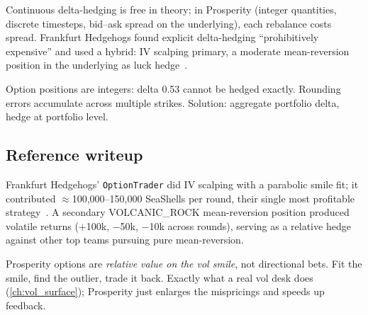 \begin{pitfallbox}
Continuous delta-hedging is free in theory; in Prosperity (integer
quantities, discrete timesteps, bid--ask spread on the underlying),
each rebalance costs spread.  Frankfurt Hedgehogs found explicit
delta-hedging ``prohibitively expensive'' and used a hybrid: IV
scalping primary, a moderate mean-reversion position in the
underlying as luck
hedge~\citep{frankfurthedgehogs2025}.
\end{pitfallbox}

\begin{pitfallbox}
Option positions are integers: delta 0.53 cannot be hedged exactly.
Rounding errors accumulate across multiple strikes.  Solution:
aggregate portfolio delta, hedge at portfolio level.
\end{pitfallbox}

\subsection{Reference writeup}

Frankfurt Hedgehogs' \texttt{OptionTrader} did IV scalping with a
parabolic smile fit; it contributed $\approx$100{,}000--150{,}000
SeaShells per round, their single most profitable
strategy~\citep{frankfurthedgehogs2025}.  A secondary VOLCANIC\_ROCK
mean-reversion position produced volatile returns ($+$100k, $-$50k,
$-$10k across rounds), serving as a relative hedge against other top
teams pursuing pure mean-reversion.

\begin{intuitionbox}
Prosperity options are \emph{relative value on the vol smile}, not
directional bets.  Fit the smile, find the
outlier, trade it back.  Exactly what a real vol desk does
(\cref{ch:vol_surface}); Prosperity just enlarges the mispricings and
speeds up feedback.
\end{intuitionbox}

